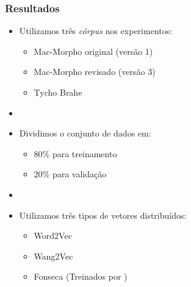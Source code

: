 \documentclass[10pt]{beamer}
\begin{document}
\begin{frame}[fragile]
  \frametitle{Resultados}

  \begin{itemize}

    \item Utilizamos três \textit{córpus} nos experimentos:
    \begin{itemize}
      \item[-] Mac-Morpho original (versão 1)
      \item[-] Mac-Morpho revisado (versão 3)
      \item[-] Tycho Brahe
    \end{itemize}

     \item[\ ] \ 

    \item Dividimos o conjunto de dados em:
    \begin{itemize}
      \item[-] 80\% para treinamento
      \item[-] 20\% para validação
    \end{itemize}

    \item[\ ] \ 

    \item Utilizamos três tipos de vetores distribuídos:
    \begin{itemize}
      \item[-] Word2Vec
      \item[-] Wang2Vec
      \item[-] Fonseca (Treinados por )
    \end{itemize}

  \end{itemize}

\end{frame}
\end{document}
